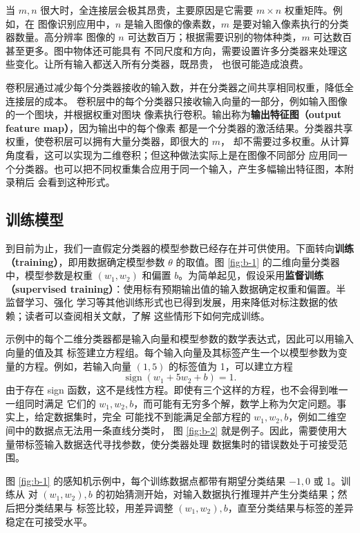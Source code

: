 当 $m,n$ 很大时，全连接层会极其昂贵，主要原因是它需要 $m\times n$ 权重矩阵。例如，在
图像识别应用中，$n$ 是输入图像的像素数，$m$ 是要对输入像素执行的分类器数量。高分辨率
图像的 $n$ 可达数百万；根据需要识别的物体种类，$m$ 可达数百甚至更多。图中物体还可能具有
不同尺度和方向，需要设置许多分类器来处理这些变化。让所有输入都送入所有分类器，既昂贵，
也很可能造成浪费。

卷积层通过减少每个分类器接收的输入数，并在分类器之间共享相同权重，降低全连接层的成本。
卷积层中的每个分类器只接收输入向量的一部分，例如输入图像的一个图块，并根据权重对图块
像素执行卷积。输出称为\textbf{输出特征图（output feature map）}，因为输出中的每个像素
都是一个分类器的激活结果。分类器共享权重，使卷积层可以拥有大量分类器，即很大的 $m$，
却不需要过多权重。从计算角度看，这可以实现为二维卷积；但这种做法实际上是在图像不同部分
应用同一个分类器。也可以把不同权重集合应用于同一个输入，产生多幅输出特征图，本附录稍后
会看到这种形式。

\subsection{训练模型}
\label{sec:appb-training-models}

到目前为止，我们一直假定分类器的模型参数已经存在并可供使用。下面转向\textbf{训练
（training）}，即用数据确定模型参数 $\theta$ 的取值。图 \ref{fig:b-1} 的二维向量分类器
中，模型参数是权重 $(w_1,w_2)$ 和偏置 $b$。为简单起见，假设采用\textbf{监督训练
（supervised training）}：使用标有预期输出值的输入数据确定权重和偏置。半监督学习、强化
学习等其他训练形式也已得到发展，用来降低对标注数据的依赖；读者可以查阅相关文献，了解
这些情形下如何完成训练。

示例中的每个二维分类器都是输入向量和模型参数的数学表达式，因此可以用输入向量的值及其
标签建立方程组。每个输入向量及其标签产生一个以模型参数为变量的方程。例如，若输入向量
$(1,5)$ 的标签值为 1，可以建立方程
\begin{equation}
  \operatorname{sign}(w_1+5w_2+b)=1.
  \label{eq:appb-5}
\end{equation}
由于存在 sign 函数，这不是线性方程。即使有三个这样的方程，也不会得到唯一一组同时满足
它们的 $w_1,w_2,b$，而可能有无穷多个解，数学上称为欠定问题。事实上，给定数据集时，完全
可能找不到能满足全部方程的 $w_1,w_2,b$，例如二维空间中的数据点无法用一条直线分类时，
图 \ref{fig:b-2} 就是例子。因此，需要使用大量带标签输入数据迭代寻找参数，使分类器处理
数据集时的错误数处于可接受范围。

图 \ref{fig:b-1} 的感知机示例中，每个训练数据点都带有期望分类结果 $-1,0$ 或 1。训练从
对 $(w_1,w_2),b$ 的初始猜测开始，对输入数据执行推理并产生分类结果；然后把分类结果与
标签比较，用差异调整 $(w_1,w_2),b$，直至分类结果与标签的差异稳定在可接受水平。

